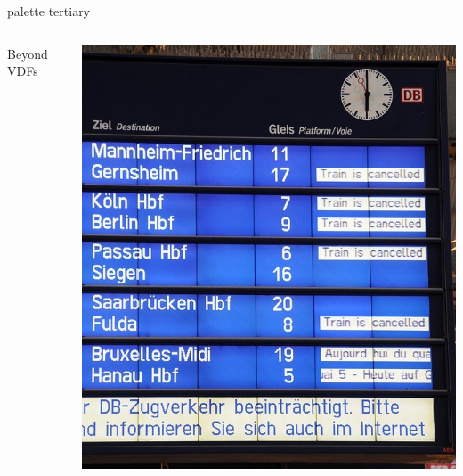 \documentclass[aspectratio=169]{beamer}
\begin{document}

\begin{frame}[plain]
  \begin{beamercolorbox}[sep=0.1px,center,wd=\paperwidth,ht=\paperheight]{palette tertiary}
    \begin{columns}
      \begin{column}{0.55\textwidth}
        \Huge\centering Beyond VDFs
      \end{column}
      \begin{column}{0.45\textwidth}
        \includegraphics[height=\paperheight]{db.jpg}
      \end{column}
    \end{columns}
  \end{beamercolorbox}
\end{frame}

\end{document}

